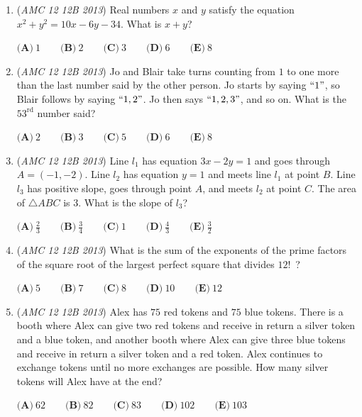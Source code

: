 \begin{enumerate}
 $\textbf{(A)}\ 22 \qquad \textbf{(B)}\ 23.25 \qquad \textbf{(C)}\ 24.75 \qquad \textbf{(D)}\ 26.25 \qquad \textbf{(E)}\ 28$


	\item (\textit{AMC 12 12B 2013}) Real numbers $x$ and $y$ satisfy the equation $x^2 + y^2 = 10x - 6y - 34$. What is $x + y$?


 $\textbf{(A)}\ 1 \qquad \textbf{(B)}\ 2 \qquad \textbf{(C)}\ 3 \qquad \textbf{(D)}\ 6 \qquad \textbf{(E)}\ 8$


	\item (\textit{AMC 12 12B 2013}) Jo and Blair take turns counting from $1$ to one more than the last number said by the other person. Jo starts by saying $``1"$, so Blair follows by saying $``1, 2"$. Jo then says $``1, 2, 3"$, and so on. What is the $53^{\text{rd}}$ number said?


 $\textbf{(A)}\ 2 \qquad \textbf{(B)}\ 3 \qquad \textbf{(C)}\ 5 \qquad \textbf{(D)}\ 6 \qquad \textbf{(E)}\ 8$


	\item (\textit{AMC 12 12B 2013}) Line $l_1$ has equation $3x - 2y = 1$ and goes through $A = (-1, -2)$. Line $l_2$ has equation $y = 1$ and meets line $l_1$ at point $B$. Line $l_3$ has positive slope, goes through point $A$, and meets $l_2$ at point $C$. The area of $\triangle ABC$ is $3$. What is the slope of $l_3$?


 $\textbf{(A)}\ \frac{2}{3} \qquad \textbf{(B)}\ \frac{3}{4} \qquad \textbf{(C)}\ 1 \qquad \textbf{(D)}\ \frac{4}{3} \qquad \textbf{(E)}\ \frac{3}{2}$


	\item (\textit{AMC 12 12B 2013}) What is the sum of the exponents of the prime factors of the square root of the largest perfect square that divides $12!$ ?


 $\textbf{(A)}\ 5 \qquad \textbf{(B)}\ 7 \qquad \textbf{(C)}\ 8 \qquad \textbf{(D)}\ 10 \qquad \textbf{(E)}\ 12$


	\item (\textit{AMC 12 12B 2013}) Alex has $75$ red tokens and $75$ blue tokens. There is a booth where Alex can give two red tokens and receive in return a silver token and a blue token, and another booth where Alex can give three blue tokens and receive in return a silver token and a red token. Alex continues to exchange tokens until no more exchanges are possible. How many silver tokens will Alex have at the end?


 $\textbf{(A)}\ 62 \qquad \textbf{(B)}\ 82 \qquad \textbf{(C)}\ 83 \qquad \textbf{(D)}\ 102 \qquad \textbf{(E)}\ 103$



\end{enumerate}
